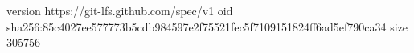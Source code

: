 version https://git-lfs.github.com/spec/v1
oid sha256:85c4027ee577773b5cdb984597e2f75521fec5f7109151824ff6ad5ef790ca34
size 305756
